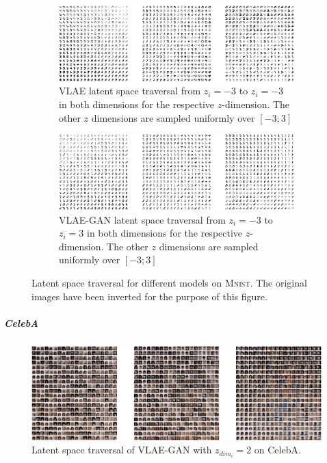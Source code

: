\begin{figure}
    \ContinuedFloat
    \centering
    \begin{subfigure}{\textwidth}
        \centering
        \includegraphics[width=\textwidth]{images/latent_space_traversals/vlae_mnist.png}
        \caption{\ac{VLAE} latent space traversal from $z_i=-3$ to $z_i=-3$ in both dimensions for the respective $z$-dimension. The other $z$ dimensions are sampled uniformly over $[-3; 3]$}
        \label{subfig:vlae_mnist_latent_space_traversal}
    \end{subfigure}
    \begin{subfigure}{\textwidth}
        \centering
        \includegraphics[width=\textwidth]{images/latent_space_traversals/vlae_gan_mnist.png}
        \caption{\ac{VLAE}-\ac{GAN} latent space traversal from $z_i=-3$ to $z_i=3$ in both dimensions for the respective $z$-dimension. The other $z$ dimensions are sampled uniformly over $[-3; 3]$}
        \label{subfig:vlae_gan_mnist_latent_space_traversal}
    \end{subfigure}
    \caption[Models on \textsc{Mnist} - Latent Space Traversal]{Latent space traversal for different models on \textsc{Mnist}. The original images have been inverted for the purpose of this figure.}
    \label{fig:mnist_latent_space_traversal}
\end{figure}

\subparagraph{CelebA}

\begin{figure}
    \centering
    \includegraphics[width=\textwidth]{images/latent_space_traversals/vlae_gan_celeba.png}
    \caption[\ac{VLAE}-\ac{GAN} on CelebA: Latent Space Traversal]{Latent space traversal of \ac{VLAE}-\ac{GAN} with $z_{dim_i}=2$ on CelebA.}
    \label{fig:celeba_latent_space_traversal}
\end{figure}

